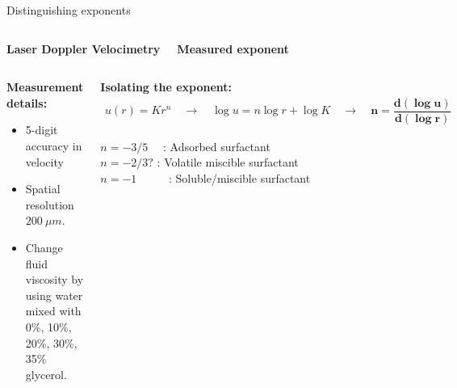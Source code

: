 \documentclass[compress,10pt,dvipsnames,svgnames,pdftex]{beamer}
\begin{document}
\begin{frame}{Distinguishing exponents}

\begin{columns}
\column{6cm}
\begin{mdframed}[style=MyFrame]
\centerline{\bf Laser Doppler Velocimetry}
\centerline{}
\end{mdframed}

\column{6cm}
\begin{mdframed}[style=MyFrame]
\centerline{\bf Measured exponent}
\centerline{}
\end{mdframed}

\end{columns}

\begin{columns}
\column{4cm}
\begin{mdframed}[style=MyFrame]
{\scriptsize
{\bf Measurement details:}
\begin{itemize}
 \item 5-digit accuracy in velocity 
 \item Spatial resolution $200~\mu m$.
 \item Change fluid viscosity by using water mixed with 0\%, 10\%, 20\%, 30\%, 35\% glycerol.
\end{itemize}

}
\end{mdframed}

\column{7cm}
\begin{mdframed}[style=MyFrame]
{\scriptsize 
{\bf Isolating the exponent:}
\begin{align*}
u(r) = K r^n \quad \rightarrow \quad \log u = n \log r + \log K \quad \rightarrow \quad \boldsymbol{n = \dfrac{d (\log u)}{d (\log r)}} 
\end{align*}
\vspace{-6mm}

{\tiny 
$n=-3/5$ ~~: Adsorbed surfactant \\[-1mm]
$n=-2/3?$ : Volatile miscible surfactant \\[-1mm]
$n=-1$ ~~~~~: Soluble/miscible surfactant
}
}
\end{mdframed}
\end{columns}
\end{frame}
\end{document}
